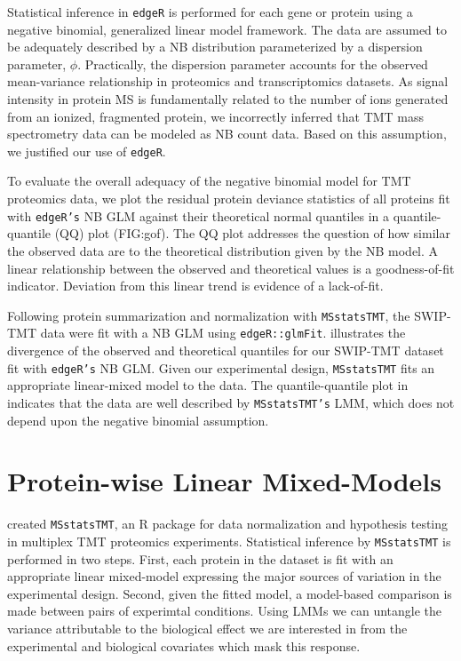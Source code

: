\documentclass[11pt]{elife}\usepackage[]{graphicx}\usepackage[]{color}
\begin{document}
Statistical inference in \texttt{edgeR} is performed for each gene or protein
using a negative binomial, generalized linear model framework.  The data are
assumed to be adequately described by a NB distribution parameterized by a
dispersion parameter, $\phi$. Practically, the dispersion parameter accounts for
the observed mean-variance relationship in proteomics and transcriptomics
datasets. As signal intensity in protein MS is fundamentally related to the
number of ions generated from an ionized, fragmented protein, we incorrectly
inferred that TMT mass spectrometry data can be modeled as NB count data. Based
on this assumption, we justified our use of \texttt{edgeR}.  

To evaluate the overall adequacy of the negative binomial model for TMT
proteomics data, we plot the residual protein deviance statistics of all
proteins fit with \texttt{edgeR's} NB GLM against their theoretical normal
quantiles in a quantile-quantile (QQ) plot (FIG:gof).  The QQ plot addresses the
question of how similar the observed data are to the theoretical distribution
given by the NB model.  A linear relationship between the observed and
theoretical values is a goodness-of-fit indicator.  Deviation from this linear
trend is evidence of a lack-of-fit.

Following protein summarization and normalization with \texttt{MSstatsTMT}, the
SWIP-TMT data were fit with a NB GLM using \texttt{edgeR::glmFit}. 
illustrates the divergence of the observed and theoretical quantiles for our
SWIP-TMT dataset fit with \texttt{edgeR's} NB GLM. Given our experimental
design, \texttt{MSstatsTMT} fits an appropriate linear-mixed model to the data.
The quantile-quantile plot in  indicates that the data are well
described by \texttt{MSstatsTMT's} LMM, which does not depend upon the negative
binomial assumption.


\section{Protein-wise Linear Mixed-Models}

\cite{Huang2020} created \texttt{MSstatsTMT}, an R package for data
normalization and hypothesis testing in multiplex TMT proteomics experiments.
Statistical inference by \texttt{MSstatsTMT} is performed in two steps.
First, each protein in the dataset is fit with an appropriate linear mixed-model
expressing the major sources of variation in the experimental design.
Second, given the fitted model, a model-based comparison is made between pairs
of experimtal conditions. Using LMMs we can untangle the variance
attributable to the biological effect we are interested in from the experimental
and biological covariates which mask this response.
\end{document}
